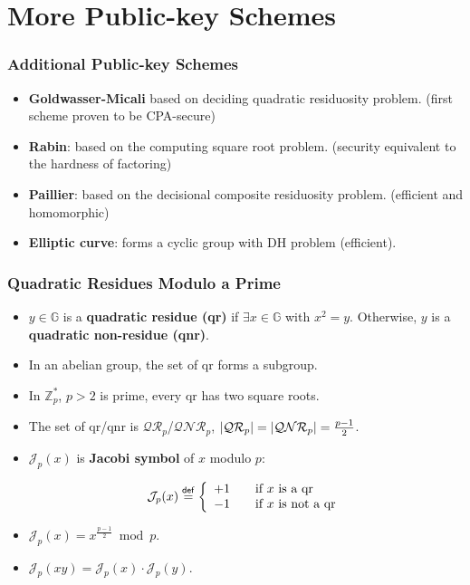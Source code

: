 \section{More Public-key Schemes}
\begin{frame}\frametitle{Additional Public-key Schemes}
\begin{itemize}
\item \textbf{Goldwasser-Micali} based on deciding quadratic residuosity problem. (first scheme proven to be CPA-secure)
\item \textbf{Rabin}: based on the computing square root problem. (security equivalent to the hardness of factoring)
\item \textbf{Paillier}: based on the decisional composite residuosity problem. (efficient and homomorphic)
\item \textbf{Elliptic curve}: forms a cyclic group with DH problem (efficient).
\end{itemize}
\end{frame}
\begin{frame}\frametitle{Quadratic Residues Modulo a Prime}
\begin{itemize}
\item $y \in \mathbb{G}$ is a \textbf{quadratic residue (qr)} if $\exists x \in \mathbb{G}$ with $x^2 = y$. Otherwise, $y$ is a \textbf{quadratic non-residue (qnr)}.
\item In an abelian group, the set of qr forms a subgroup.
\item In $\mathbb{Z}_p^*$, $p> 2$ is prime, every qr has two square roots.
\item The set of qr/qnr is $\mathcal{QR}_p$/$\mathcal{QNR}_p$,
$\lvert\mathcal{QR}_p\rvert= \lvert\mathcal{QNR}_p\rvert = \frac{p-1}{2}$.
\item $\mathcal{J}_p(x)$ is \textbf{Jacobi symbol} of $x$ modulo $p$:

\[
  \mathcal{J}_p(x) \overset{\mathsf{def}}{=} \left\{ 
  \begin{array}{l l}
    +1 & \quad \text{if $x$ is a qr}\\
    -1 & \quad \text{if $x$ is not a qr}\\
  \end{array} \right .
\]
\item $\mathcal{J}_p(x) = x ^{\frac{p-1}{2}} \bmod p$.
\item $\mathcal{J}_p(xy) = \mathcal{J}_p(x)\cdot \mathcal{J}_p(y)$.
\end{itemize}
\end{frame}
